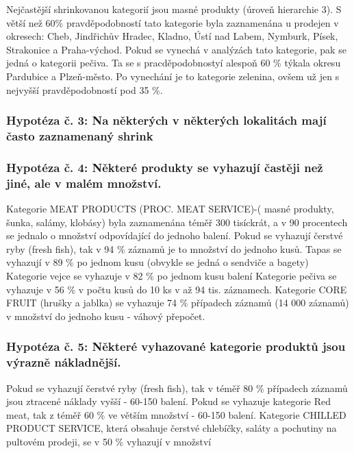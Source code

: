 Nejčastější shrinkovanou kategorií jsou masné produkty (úroveň hierarchie 3). S větší než 60\% pravděpodobností tato kategorie byla zaznamenána u prodejen  v okresech: Cheb, Jindřichův Hradec, Kladno, Ústí nad Labem, Nymburk, Písek, Strakonice a Praha-východ. Pokud se vynechá v analýzách tato kategorie, pak se jedná o kategorii pečiva. Ta se s pracděpodobnostyí alespoň 60 \% týkala okresu Pardubice a Plzeň-město. Po vynechání je to kategorie zelenina, ovšem už jen s nejvyšší pravděpodobností pod 35 \%.


\subsubsection*{Hypotéza č. 3: Na některých v některých lokalitách mají často zaznamenaný shrink}
\subsubsection*{Hypotéza č. 4: Některé produkty se vyhazují častěji než jiné, ale v malém množství.}

 Kategorie MEAT PRODUCTS (PROC. MEAT SERVICE)-( masné produkty, šunka, salámy, klobásy) byla zaznamenána téměř 300 tisíckrát, a v 90 procentech se jednalo o množství odpovídající do jednoho balení. 
 Pokud se vyhazují čerstvé ryby (fresh fish), tak v 94 
\% záznamů je to množství do jednoho kusů. Tapas se vyhazují v 89 \% po jednom kusu (obvykle se jedná o sendviče a bagety)
Kategorie vejce se vyhazuje v 82 \% po jednom kusu balení
Kategorie pečiva se vyhazuje v 56 \% v počtu kusů do 10 ks v až 94 tis. záznamech.
Kategorie CORE FRUIT (hrušky a jablka) se vyhazuje 74 \% případech záznamů (14 000 záznamů) v množství do jednoho kusu - váhový přepočet.

\subsubsection*{Hypotéza č. 5: Některé vyhazované kategorie produktů jsou výrazně nákladnější.}

Pokud se vyhazují čerstvé ryby (fresh fish), tak v téměř 80 \% případech záznamů jsou ztracené náklady vyšší  - 60-150 balení.
Pokud se vyhazuje kategorie Red meat, tak z téměř 60 \% ve větším množství - 60-150 balení.
Kategorie CHILLED PRODUCT SERVICE, která obsahuje čerstvé chlebíčky, saláty a pochutiny na pultovém prodeji, se v 50 \% vyhazují v množství

